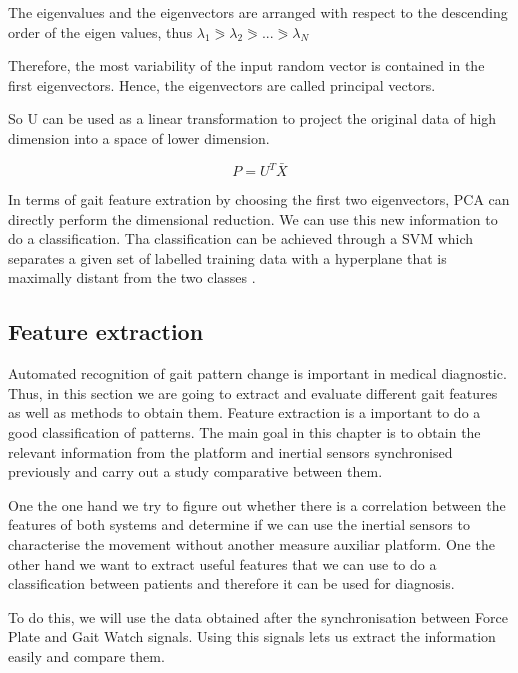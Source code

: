 The eigenvalues and the eigenvectors are arranged with respect to the descending order of the eigen values, thus $\lambda_{1}\eqslantgtr\lambda_{2}\eqslantgtr...\eqslantgtr\lambda_{N}$

Therefore, the most variability of the input random vector is contained in the first eigenvectors. Hence, the eigenvectors are called principal vectors.

So U can be used as a linear transformation to project the original data of high dimension into a space of lower dimension.

$$P=U^T\bar{X}$$

In terms of gait feature extration by choosing the first two eigenvectors, PCA can directly perform the dimensional reduction\cite{Jeon}.
We can use this new information to do a classification. Tha classification can be achieved through a SVM which separates a given set of labelled training data with a hyperplane that is maximally distant from the two classes \cite{Gorriz}.

\subsection{Feature extraction}
Automated recognition of gait pattern change is important in medical diagnostic. Thus, in this section we are going to extract and evaluate different gait features as well as methods to obtain them. Feature extraction is a important	to do a good classification of patterns.
The main goal in this chapter is to obtain the relevant information from the platform and inertial sensors synchronised previously and carry out a study comparative between them.

One the one hand we try to figure out whether there is a correlation between the features of both systems and determine if we can use the inertial sensors to characterise the movement without another measure auxiliar  platform.
One the other hand we want to extract useful features that we can use to do a classification between patients and therefore it can be used for diagnosis.

To do this, we will use the data obtained after the synchronisation between Force Plate and Gait Watch signals. Using this signals lets us extract the information easily and compare them.

